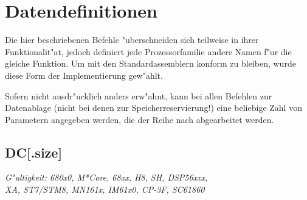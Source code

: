 \documentclass[12pt,a4paper,twoside]{report}
\makeatletter
\newcommand{\ttindex}[1]{\index{#1@{\tt #1}}}
\makeatother
\begin{document}

\section{Datendefinitionen}

Die hier beschriebenen Befehle "uberschneiden sich teilweise in ihrer
Funktionalit"at, jedoch definiert jede Prozessorfamilie andere Namen
f"ur die gleiche Funktion.  Um mit den Standardassemblern konform zu
bleiben, wurde diese Form der Implementierung gew"ahlt.

Sofern nicht ausdr"ucklich anders erw"ahnt, kann bei allen Befehlen zur
Datenablage (nicht bei denen zur Speicherreservierung!) eine beliebige Zahl
von Parametern angegeben werden, die der Reihe nach abgearbeitet werden.


\subsection{DC[.size]}
\ttindex{DC}

{\em G"ultigkeit: 680x0, M*Core, 68xx, H8, SH, DSP56xxx,\\
     XA, ST7/STM8, MN161x, IM61x0, CP-3F, SC61860}
\end{document}
